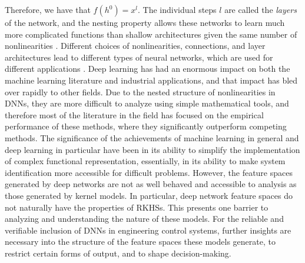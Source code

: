 \documentclass[letterpaper,12pt,peerreviewca,draftcls]{IEEEtran}
\begin{document}
Therefore, we have that $f(h^0) = x^l$. 
The individual steps $l$ are called the \emph{layers} of the network, and the nesting property allows these networks to learn much more complicated functions than shallow architectures given the same number of nonlinearities 
\cite{bengio2009learning}. Different choices of nonlinearities, connections, and layer architectures lead to different types of neural networks, which are used for different applications \cite{goodfellow2016deep}. Deep learning has had an enormous impact on both the machine learning literature and industrial applications, and that impact has bled over rapidly to other fields. Due to the nested structure of nonlinearities in DNNs, they are more difficult to analyze using simple mathematical tools, and therefore most of the literature in the field has focused on the empirical performance of these methods, where they significantly outperform competing methods.  The significance of the achievements of machine learning in general and deep learning in particular have been in its ability to simplify the implementation of complex functional representation, essentially, in its ability to make system identification more accessible for difficult problems. However, the feature spaces generated by deep networks are not as well behaved and accessible to analysis as those generated by kernel models. In particular, deep network feature spaces do not naturally have the properties of RKHSs.  This presents one barrier to analyzing and understanding the nature of these models. For the reliable and verifiable inclusion of DNNs in engineering control systems, %
further insights are necessary into the structure of the feature spaces
these models generate, to restrict certain forms of output, and to shape decision-making. 
\end{document}
